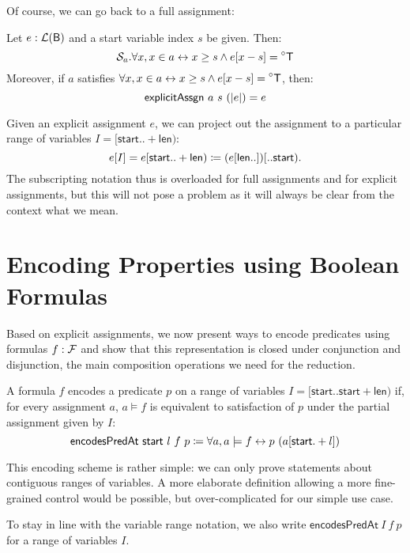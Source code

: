 \newcommand{\expandA}{\textsf{expandAssgn}}
Of course, we can go back to a full assignment: 
\begin{proposition} 
  Let $e : \mathcal{L} (\textsf{B})$ and a start variable index $s$ be given. Then:
  \[\sigtype{a}. \forall x, x \in a \leftrightarrow x \ge s \land e[x-s] = \OSome{\btrue} \]
  Moreover, if $a$ satisfies $\forall x, x \in a \leftrightarrow x \ge s \land e[x-s] = \OSome{\btrue}$, then:
  \[\textsf{explicitAssgn}~a~s~(|e|) = e \]
\end{proposition}


\newcommand{\projVars}{\textsf{projVars}}
Given an explicit assignment $e$, we can project out the assignment to a particular range of variables $I = [\textsf{start}.. +\textsf{len})$:
\[e[I] = e[\textsf{start}..+\textsf{len}) \coloneqq (e[\textsf{len} ..])[.. \textsf{start}).\] 
The subscripting notation thus is overloaded for full assignments and for explicit assignments, but this will not pose a problem as it will always be clear from the context what we mean.

\section{Encoding Properties using Boolean Formulas}
Based on explicit assignments, we now present ways to encode predicates using formulas $f : \mathcal{F}$ and show that this representation is closed under conjunction and disjunction, the main composition operations we need for the reduction.

\newcommand{\encodesPred}{\textsf{encodesPredAt}}
\begin{definition}
  \mnote{\encodesPred}
  A formula $f$ encodes a predicate $p$ on a range of variables $I = [\textsf{start}.. \textsf{start} + \textsf{len})$ if, for every assignment $a$, $a \models f$ is equivalent to satisfaction of $p$ under the partial assignment given by $I$:
  \[\encodesPred~\textsf{start}~l~f~p \defeq \forall a, a \models f \leftrightarrow p~(a[\textsf{start} . + l]) \]
\end{definition}

This encoding scheme is rather simple: we can only prove statements about contiguous ranges of variables. 
A more elaborate definition allowing a more fine-grained control would be possible, but over-complicated for our simple use case.

To stay in line with the variable range notation, we also write $\encodesPred~I~f~p$ for a range of variables $I$.


